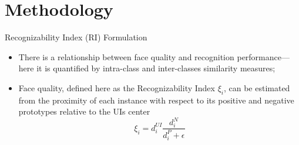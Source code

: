\documentclass[aspectratio=169,xcolor=dvipsnames]{beamer}
\begin{document}
\section{Methodology}
\begin{frame}{Recognizability Index (RI) Formulation}
   \begin{itemize}
       \item There is a relationship between face quality and recognition performance---here it is quantified by intra-class and inter-classes similarity measures;
       \item Face quality, defined here as the Recognizability Index $\xi_i$, can be estimated from the proximity of each instance with respect to its positive and negative prototypes relative to the UIs center
       $$\xi_i = d_{i}^{UI} \frac{d_i^N}{d_i^P + \epsilon}$$
   \end{itemize} 
\end{frame}
\end{document}

